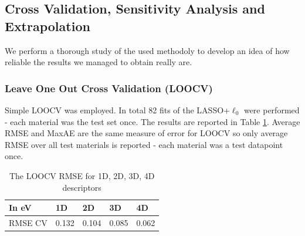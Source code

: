 \documentclass[11pt,oneside,czech,american]{book} %
\theoremstyle{plain}
\theoremstyle{definition}
\begin{document}
\subsection{Cross Validation, Sensitivity Analysis and Extrapolation}
We perform a thorough study of the used methodoly to develop an idea of how reliable the results we managed to obtain really are.

\subsubsection{Leave One Out Cross Validation (LOOCV)}
Simple LOOCV was employed. In total 82 fits of the LASSO+$\ell_{0}$ were performed - each material was the test set once. The results are reported in Table \ref{RMSE_LOOCV}. Average RMSE and MaxAE are the same measure of error for LOOCV so only average RMSE over all test materials is reported - each material was a test datapoint once.
\begin{table}[H]
	\centering
	\begin{tabular}{lllll} 
		\hline
		In eV  & 1D   & 2D  & 3D   & 4D    \\ 
		\hline
		RMSE CV   & 0.132 & 0.104 & 0.085 & 0.062  \\
		\hline
	\end{tabular}
	\caption{The LOOCV RMSE for 1D, 2D, 3D, 4D descriptors}
	\label{RMSE_LOOCV}
\end{table}
\end{document}
